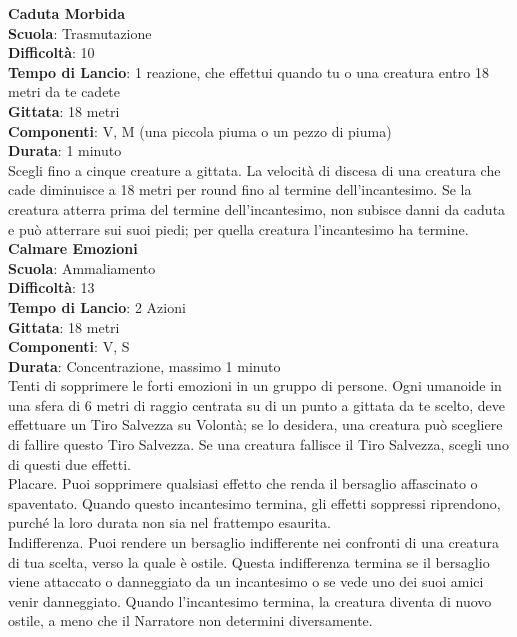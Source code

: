 \begin{multicols}{2}
\medskip\textbf{Caduta Morbida}\\
\textbf{Scuola}: Trasmutazione\\
\textbf{Difficoltà}:  10\\
\textbf{Tempo di Lancio}: 1 reazione, che effettui quando tu o una creatura entro 18 metri da te cadete\\
\textbf{Gittata}: 18 metri\\
\textbf{Componenti}: V, M (una piccola piuma o un pezzo di piuma)\\
\textbf{Durata}: 1 minuto\\
Scegli fino a cinque creature a gittata. La velocità di discesa di una creatura che cade diminuisce a 18 metri per round fino al termine dell'incantesimo. Se la creatura atterra prima del termine dell'incantesimo, non subisce danni da caduta e può atterrare sui suoi piedi; per quella creatura l'incantesimo ha termine.\\

\medskip\textbf{Calmare Emozioni}\\
\textbf{Scuola}: Ammaliamento\\
\textbf{Difficoltà}:  13\\
\textbf{Tempo di Lancio}: 2 Azioni\\
\textbf{Gittata}: 18 metri\\
\textbf{Componenti}: V, S\\
\textbf{Durata}: Concentrazione, massimo 1 minuto\\
Tenti di sopprimere le forti emozioni in un gruppo di persone. Ogni umanoide in una sfera di 6 metri di raggio centrata su di un punto a gittata da te scelto, deve effettuare un Tiro Salvezza su Volontà; se lo  desidera, una creatura può scegliere di fallire questo Tiro Salvezza. Se una creatura fallisce il Tiro Salvezza, scegli uno di questi due effetti. \\
Placare. Puoi sopprimere qualsiasi effetto che renda il bersaglio affascinato o spaventato. Quando questo incantesimo termina, gli effetti soppressi riprendono, purché la loro durata non sia nel frattempo esaurita.\\
Indifferenza. Puoi rendere un bersaglio indifferente nei confronti di una creatura di tua scelta, verso la quale è ostile. Questa indifferenza termina se il bersaglio viene attaccato o danneggiato da un incantesimo o se vede uno dei suoi amici venir danneggiato. Quando l'incantesimo termina, la creatura diventa di nuovo ostile, a meno che il Narratore non determini diversamente.


\end{multicols}
